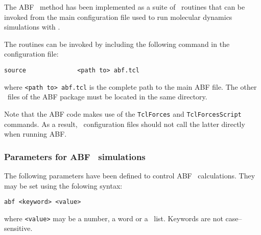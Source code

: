 The ABF \ method has been implemented as a suite of \tcl \
routines that can be invoked from the main configuration file used
to run molecular dynamics simulations with \namd.

The routines can be invoked by including the following
command in the configuration file:

\begin{verbatim}
source              <path to> abf.tcl
\end{verbatim}


where \texttt{<path to> abf.tcl} is the complete path to
the main ABF file. The other \tcl\ files of the ABF
package must be located in the same directory.

Note that the ABF code makes use of the {\tt TclForces} and
{\tt TclForcesScript} commands.
As a result, \namd\ configuration files
should not call the latter directly when running ABF.



\subsubsection{Parameters for ABF \ simulations}


The following parameters have been defined to control ABF \
calculations. They may be set using the folowing syntax:

{\tt abf <keyword> <value>}

where {\tt <value>} may be a number, a word or a \tcl\ list.
Keywords are not case--sensitive.



